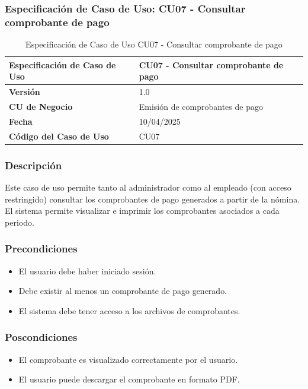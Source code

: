 \subsubsection*{Especificación de Caso de Uso: CU07 - Consultar comprobante de pago}

\begin{table}[h]
	\centering
	\caption{Especificación de Caso de Uso CU07 - Consultar comprobante de pago}
	\begin{tabular}{|p{5cm}|p{9cm}|}
		\hline
		\textbf{Especificación de Caso de Uso} & CU07 - Consultar comprobante de pago \\ \hline
		\textbf{Versión}                       & 1.0                                  \\ \hline
		\textbf{CU de Negocio}                 & Emisión de comprobantes de pago      \\ \hline
		\textbf{Fecha}                         & 10/04/2025                           \\ \hline
		\textbf{Código del Caso de Uso}        & CU07                                 \\ \hline
	\end{tabular}
\end{table}

\subsubsection*{Descripción}
Este caso de uso permite tanto al administrador como al empleado (con acceso restringido) consultar los comprobantes de pago generados a partir de la nómina. El sistema permite visualizar e imprimir los comprobantes asociados a cada periodo.

\subsubsection*{Precondiciones}
\begin{itemize}
	\item El usuario debe haber iniciado sesión.
	\item Debe existir al menos un comprobante de pago generado.
	\item El sistema debe tener acceso a los archivos de comprobantes.
\end{itemize}

\subsubsection*{Poscondiciones}
\begin{itemize}
	\item El comprobante es visualizado correctamente por el usuario.
	\item El usuario puede descargar el comprobante en formato PDF.
\end{itemize}


